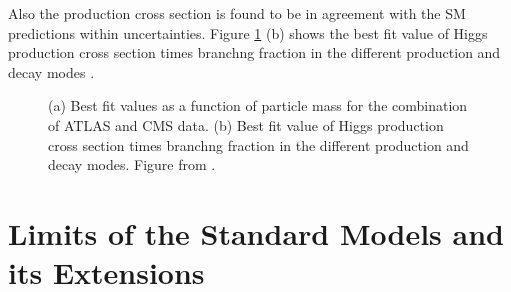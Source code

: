 Also the production cross section is found to be in agreement with the SM predictions within uncertainties. Figure \ref{fig:sm:h_couplings_mass} (b) shows the best fit value of Higgs production cross section times branchng fraction in the different production and decay modes \cite{Khachatryan:2016vau}.

\begin{figure}[ht]
\centering
{}
\caption{(a) Best fit values as a function of particle mass for the combination of ATLAS and CMS data. (b) Best fit value of Higgs production cross section times branchng fraction in the different production and decay modes. Figure from \cite{Khachatryan:2016vau}.}
\label{fig:sm:h_couplings_mass}
\end{figure}

 


\section{Limits of the Standard Models and its Extensions}
\label{sec:smsusy:bsm}

